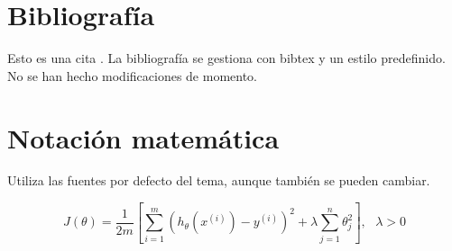 \section{Bibliografía}

Esto es una cita \cite{agenciaestatalboletínoficialdelestado_apiparaacceso_2024}. La bibliografía se gestiona con bibtex y un estilo predefinido. No se han hecho modificaciones de momento.



\section{Notación matemática}

Utiliza las fuentes por defecto del tema, aunque también se pueden cambiar.


\[
J(\theta)=\frac{1}{2m}\left[ \sum_{i=1}^m\left(h_\theta(x^{(i)})-y^{(i)}\right)^2 + \lambda \sum_{j=1}^n \theta_j^2 \right], \mbox{ } \lambda >0
\]

